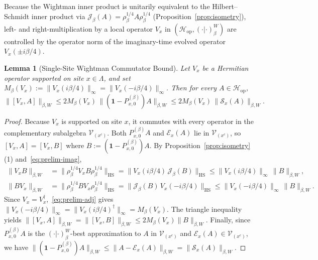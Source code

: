\documentclass[11pt,a4paper]{article}
\numberwithin{equation}{section}
\theoremstyle{plain}
\newtheorem{lemma}[theorem]{Lemma}
\theoremstyle{definition}
\newcommand{\Hop}{\mathcal{H}_{\mathrm{op}}}
\newcommand{\HS}{\mathrm{HS}}
\begin{document}
Because the Wightman inner product is unitarily equivalent to the Hilbert--Schmidt inner product via $\mathcal{J}_\beta(A) = \rho_\beta^{1/4}A\rho_\beta^{1/4}$ (Proposition~\ref{prop:isometry}), left- and right-multiplication by a local operator $V_x$ in $(\Hop,(\cdot|\cdot)_\beta^W)$ are controlled by the operator norm of the imaginary-time evolved operator $V_x(\pm i\beta/4)$.

\begin{lemma}[Single-Site Wightman Commutator Bound]\label{lem:wightman-comm}
Let $V_x$ be a Hermitian operator supported on site $x\in\Lambda$, and set $M_\beta(V_x) := \|V_x(i\beta/4)\|_\infty = \|V_x(-i\beta/4)\|_\infty$. Then for every $A\in\Hop$,
\begin{equation}\label{eq:single-site-comm}
  \bigl\|[V_x, A]\bigr\|_{\beta,W}
  \le 2 M_\beta(V_x)\,\bigl\|(\mathbf{1}-P_{x,0}^{(\beta)})A\bigr\|_{\beta,W}
  \le 2 M_\beta(V_x)\,\|\mathcal{S}_x(A)\|_{\beta,W}.
\end{equation}
\end{lemma}

\begin{proof}
Because $V_x$ is supported on site $x$, it commutes with every operator in the complementary subalgebra $\mathcal{V}_{(x^c)}$. Both $P_{x,0}^{(\beta)}A$ and $\mathcal{E}_x(A)$ lie in $\mathcal{V}_{(x^c)}$, so $[V_x, A] = [V_x, B]$ where $B := (\mathbf{1}-P_{x,0}^{(\beta)})A$. By Proposition~\ref{prop:isometry}(1) and~\eqref{eq:prelim-imag},
\begin{align*}
  \|V_x B\|_{\beta,W}
  &= \bigl\|\rho_\beta^{1/4} V_x B \rho_\beta^{1/4}\bigr\|_\HS
   = \bigl\|V_x(i\beta/4)\,\mathcal{J}_\beta(B)\bigr\|_\HS
   \le \|V_x(i\beta/4)\|_\infty\,\|B\|_{\beta,W}, \\
  \|B V_x\|_{\beta,W}
  &= \bigl\|\rho_\beta^{1/4} B V_x \rho_\beta^{1/4}\bigr\|_\HS
   = \bigl\|\mathcal{J}_\beta(B)\,V_x(-i\beta/4)\bigr\|_\HS
   \le \|V_x(-i\beta/4)\|_\infty\,\|B\|_{\beta,W}.
\end{align*}
Since $V_x = V_x^\dagger$,~\eqref{eq:prelim-adj} gives $\|V_x(-i\beta/4)\|_\infty = \|V_x(i\beta/4)^\dagger\|_\infty = M_\beta(V_x)$. The triangle inequality yields $\|[V_x,A]\|_{\beta,W} = \|[V_x,B]\|_{\beta,W} \le 2M_\beta(V_x)\|B\|_{\beta,W}$. Finally, since $P_{x,0}^{(\beta)}A$ is the $(\cdot|\cdot)_\beta^W$-best approximation to $A$ in $\mathcal{V}_{(x^c)}$ and $\mathcal{E}_x(A)\in\mathcal{V}_{(x^c)}$, we have $\|(\mathbf{1}-P_{x,0}^{(\beta)})A\|_{\beta,W} \le \|A-\mathcal{E}_x(A)\|_{\beta,W} = \|\mathcal{S}_x(A)\|_{\beta,W}$.
\end{proof}
\end{document}

